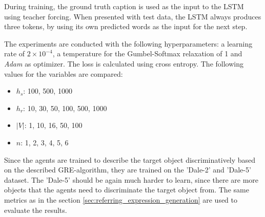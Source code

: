 During training, the ground truth caption is used as the input to the LSTM using teacher forcing.
When presented with test data, the LSTM always produces three tokens, by using its own predicted words as the input for the next step.

The experiments are conducted with the following hyperparameters: a learning rate of $2\times10^{-4}$, a temperature for the Gumbel-Softmax relaxation of 1 and \emph{Adam} \citep{Kingma2015} as optimizer.
The loss is calculated using cross entropy.
The following values for the variables are compared:
\begin{itemize}
    \item $h_s$: 100, 500, 1000
    \item $h_r$: 10, 30, 50, 100, 500, 1000
    \item $|V|$: 1, 10, 16, 50, 100
    \item $n$: 1, 2, 3, 4, 5, 6
\end{itemize}
Since the agents are trained to describe the target object discriminatively based on the described GRE-algorithm, they are trained on the 'Dale-2' and 'Dale-5' dataset.
The 'Dale-5' should be again much harder to learn, since there are more objects that the agents need to discriminate the target object from.
The same metrics as in the section \ref{sec:referring_expression_generation} are used to evaluate the results.


